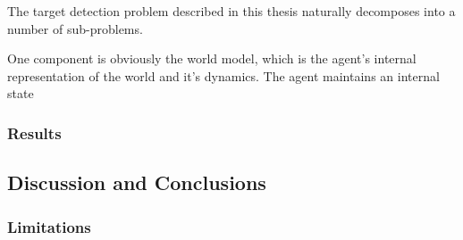The target detection problem described in this thesis naturally decomposes into a number of sub-problems. %

One component is obviously the world model, which is the agent's internal representation of the world and it's dynamics. The agent maintains an internal state
\subsubsection{Results}

\subsection{Discussion and Conclusions}
\subsubsection{Limitations}
